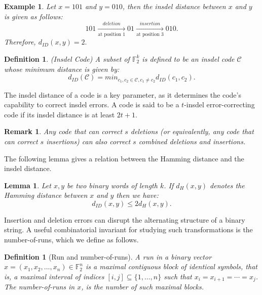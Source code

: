 \documentclass[11 pt]{article}
\numberwithin{equation}{section}
\newtheorem{lemma}[theorem]{Lemma}
\newtheorem{definition}[theorem]{Definition}
\newtheorem{example}[theorem]{Example}
\newtheorem{remark}[theorem]{Remark}
\begin{document}
     \begin{example}
        Let $x = 101$ and $y = 010$, then the insdel distance between $x$ and $y$ is given as follows:
        \begin{equation*}
        101 \xrightarrow[\text{at position 1}]{deletion} 01 \xrightarrow[\text{at position 3}]{insertion} 010.        
        \end{equation*}
       Therefore, $d_{ID}(x,y) = 2.$ 
    \end{example}
    
    \begin{definition}{(Insdel Code)}\cite{do2021explicit}
        A subset of $\mathbb{F}_2^k$ is defined to be an insdel code $\mathcal{C}$ whose minimum distance is given by:
        $$ d_{ID}(\mathcal{C}) = min_{c_1, c_2 \in \mathcal{C}, c_1 \neq c_2}{d_{ID}(c_1,c_2)}.$$
    \end{definition}
    
     The insdel distance of a code is a key parameter, as it determines the code’s capability to correct insdel errors. A code is said to be a $t$-insdel error-correcting code if its insdel distance is at least $2t+1$.

    \begin{remark}\cite{levenshtein1965двоичные}
    Any code that can correct \(s\) deletions (or equivalently, any code that can correct \(s\) insertions) can also correct \(s\) combined deletions and insertions.
    \end{remark}
    
    The following lemma gives a relation between the Hamming distance and the insdel distance.

    \begin{lemma}\label{lem:rel_insdel_hamming}\cite{liu2022bounds}
    Let $x, y$ be two binary words of length $k$. If $d_H(x,y)$ denotes the Hamming distance between $x$ and $y$ then we have:
    $$ d_{ID}(x,y) \leq 2d_H(x,y).$$
    \end{lemma}

    Insertion and deletion errors can disrupt the alternating structure of a binary string. A useful combinatorial invariant for studying such transformations is the number-of-runs, which we define as follows.

    \begin{definition}[Run and number-of-runs]
    \label{def:run}
    A run in a binary vector $x = (x_1, x_2, \ldots, x_n) \in \mathbb{F}_2^n$ is a maximal contiguous block of identical symbols, that is, a maximal interval of indices $[i, j] \subseteq \{1, \ldots, n\}$ such that $x_i = x_{i+1} = \cdots = x_j$. The number-of-runs in $x$, is the number of such maximal blocks. 
    \end{definition}
    
\end{document}

